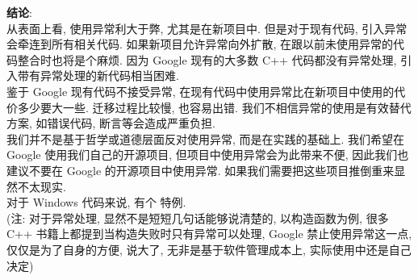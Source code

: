 \documentclass[a4paper,11pt,CJK]{article}
\begin{document}
\begin{CJK}{UTF8}{gbsn}
\begin{enumerate}
\end{enumerate}
\textbf{结论}:\\
\indent 从表面上看, 使用异常利大于弊, 尤其是在新项目中. 但是对于现有代码, 引入异常会牵连到所有相关代码. 如果新项目允许异常向外扩散, 在跟以前未使用异常的代码整合时也将是个麻烦. 因为 Google 现有的大多数 C++ 代码都没有异常处理, 引入带有异常处理的新代码相当困难.\\
\indent 鉴于 Google 现有代码不接受异常, 在现有代码中使用异常比在新项目中使用的代价多少要大一些. 迁移过程比较慢, 也容易出错. 我们不相信异常的使用是有效替代方案, 如错误代码, 断言等会造成严重负担.\\
\indent 我们并不是基于哲学或道德层面反对使用异常, 而是在实践的基础上. 我们希望在 Google 使用我们自己的开源项目, 但项目中使用异常会为此带来不便, 因此我们也建议不要在 Google 的开源项目中使用异常. 如果我们需要把这些项目推倒重来显然不太现实.\\
\indent 对于 Windows 代码来说, 有个 特例.\\
\indent (注: 对于异常处理, 显然不是短短几句话能够说清楚的, 以构造函数为例, 很多 C++ 书籍上都提到当构造失败时只有异常可以处理, Google 禁止使用异常这一点, 仅仅是为了自身的方便, 说大了, 无非是基于软件管理成本上, 实际使用中还是自己决定)



\end{CJK}
\end{document}
